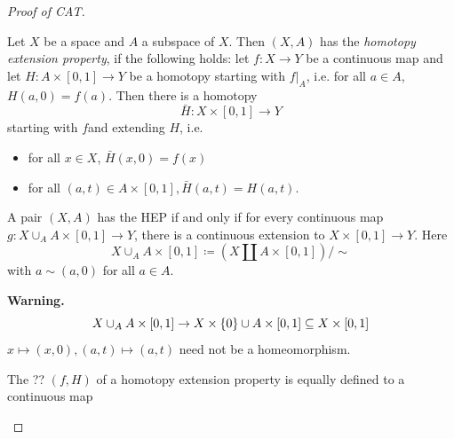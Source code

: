 \documentclass{TemplateLecture}
\begin{document}
\begin{proof}[Proof of CAT]
    \begin{defi}{}{}
        Let \(X\) be a space and \(A\) a subspace of \(X\). Then \((X,A)\) has the \emph{homotopy extension property}, if the following holds: let \(f\colon X\to Y\) be a continuous map and let \(H\colon A\times [0,1] \to Y\) be a homotopy starting with \(f\rvert_A\), i.e. for all \(a \in A\), \(H(a,0) = f(a)\). Then there is a homotopy
        \[\bar H \colon X \times [0,1] \to Y\]
        starting with \(f\)and extending \(H\), i.e.
        \begin{itemize}
            \item for all \(x \in X\), \(\bar H(x,0) = f(x)\)
            \item for all \((a,t) \in A\times [0,1], \bar H(a,t) = H(a,t)\).
        \end{itemize}
    \end{defi}

    \begin{lem}{}{}
        A pair \((X,A)\) has the HEP if and only if for every continuous map \(g\colon X\cup_A A \times [0,1] \to Y\), there is a continuous extension to \(X\times [0,1] \to Y\). Here
        \[X \cup_A A \times [0,1] \coloneq (X\amalg A \times [0,1])/\sim\]
        with \(a \sim (a,0)\) for all \(a \in A\).
    \end{lem}

    \textbf{Warning.}
    \[X\cup_A A\times [0,1] \to X \times \{0\} \cup A \times [0,1] \subseteq X \times [0,1]\] \(x \mapsto (x,0), (a,t) \mapsto (a,t)\)
        need not be a homeomorphism.

    \begin{proposition}
        The  ?? \((f, H)\) of a homotopy extension property is equally defined to a continuous map
        \[\]%


\end{proposition}
\end{proof}
\end{document}
